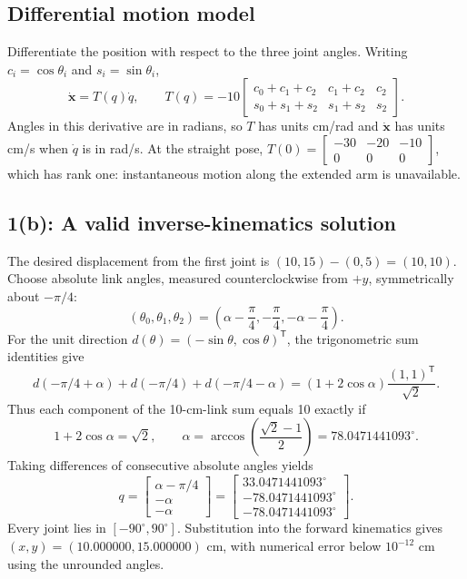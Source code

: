 \documentclass[10pt,letterpaper]{article}
\newcommand{\T}{^{\mathsf T}}
\begin{document}
\subsection*{Differential motion model}
Differentiate the position with respect to the three joint angles. Writing
$c_i=\cos\theta_i$ and $s_i=\sin\theta_i$,
\begin{equation}
\boxed{\dot{\boldsymbol{x}}=T(q)\dot q,\qquad
T(q)=-10\begin{bmatrix}
c_0+c_1+c_2&c_1+c_2&c_2\\
s_0+s_1+s_2&s_1+s_2&s_2
\end{bmatrix}.}
\end{equation}
Angles in this derivative are in radians, so $T$ has units cm/rad and
$\dot{\boldsymbol{x}}$ has units cm/s when $\dot q$ is in rad/s.
At the straight pose, $T(0)=\left[\begin{smallmatrix}-30&-20&-10\\0&0&0\end{smallmatrix}\right]$,
which has rank one: instantaneous motion along the extended arm is unavailable.

\clearpage
\subsection*{1(b): A valid inverse-kinematics solution}
The desired displacement from the first joint is $(10,15)-(0,5)=(10,10)$.
Choose absolute link angles, measured counterclockwise from $+y$, symmetrically
about $-\pi/4$:
\[
(\theta_0,\theta_1,\theta_2)
=\left(\alpha-\frac\pi4,-\frac\pi4,-\alpha-\frac\pi4\right).
\]
For the unit direction $d(\theta)=(-\sin\theta,\cos\theta)\T$, the trigonometric
sum identities give
\[
d(-\pi/4+\alpha)+d(-\pi/4)+d(-\pi/4-\alpha)
=(1+2\cos\alpha)\frac{(1,1)\T}{\sqrt2}.
\]
Thus each component of the 10-cm-link sum equals 10 exactly if
\[
1+2\cos\alpha=\sqrt2,\qquad
\alpha=\arccos\left(\frac{\sqrt2-1}{2}\right)
=78.0471441093^\circ.
\]
Taking differences of consecutive absolute angles yields
\begin{equation}
\boxed{q=\begin{bmatrix}\alpha-\pi/4\\-\alpha\\-\alpha\end{bmatrix}
=\begin{bmatrix}33.0471441093^\circ\\-78.0471441093^\circ\\-78.0471441093^\circ\end{bmatrix}.}
\end{equation}
Every joint lies in $[-90^\circ,90^\circ]$. Substitution into the forward
kinematics gives $(x,y)=(10.000000,15.000000)$ cm, with numerical error
below $10^{-12}$ cm using the unrounded angles.
\end{document}
